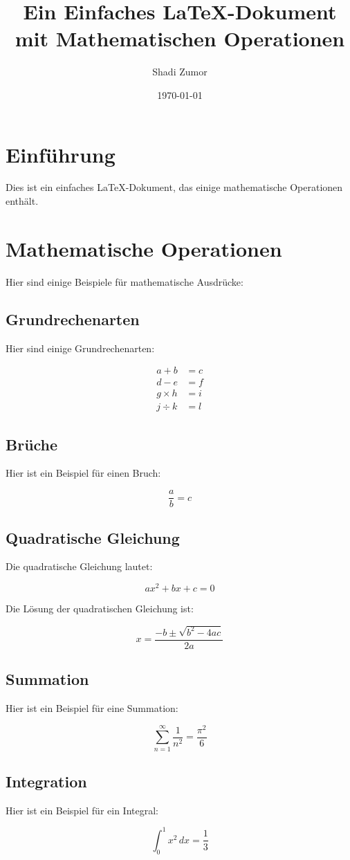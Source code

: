 \documentclass{article}
\begin{document}
\title{Ein Einfaches LaTeX-Dokument mit Mathematischen Operationen}
\author{Shadi Zumor}
\date{\today}
\maketitle

\section{Einführung}
Dies ist ein einfaches LaTeX-Dokument, das einige mathematische Operationen enthält.

\section{Mathematische Operationen}

Hier sind einige Beispiele für mathematische Ausdrücke:

\subsection{Grundrechenarten}
Hier sind einige Grundrechenarten:

\begin{align*}
a + b &= c \\
d - e &= f \\
g \times h &= i \\
j \div k &= l
\end{align*}

\subsection{Brüche}
Hier ist ein Beispiel für einen Bruch:

\begin{equation}
\frac{a}{b} = c
\end{equation}

\subsection{Quadratische Gleichung}
Die quadratische Gleichung lautet:

\begin{equation}
ax^2 + bx + c = 0
\end{equation}

Die Lösung der quadratischen Gleichung ist:

\begin{equation}
x = \frac{-b \pm \sqrt{b^2 - 4ac}}{2a}
\end{equation}

\subsection{Summation}
Hier ist ein Beispiel für eine Summation:

\begin{equation}
\sum_{n=1}^{\infty} \frac{1}{n^2} = \frac{\pi^2}{6}
\end{equation}

\subsection{Integration}
Hier ist ein Beispiel für ein Integral:

\begin{equation}
\int_{0}^{1} x^2 \, dx = \frac{1}{3}
\end{equation}
\end{document}
